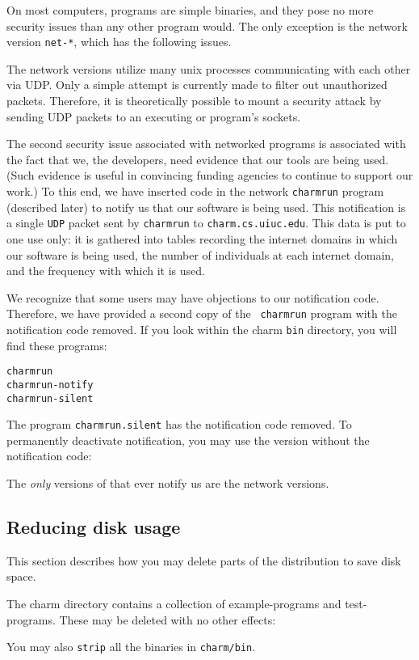 On most computers, \charmpp{} programs are simple binaries, and they pose
no more security issues than any other program would.  The only exception
is the network version {\tt net-*}, which has the following issues. 

The network versions utilize many unix processes communicating with
each other via UDP.  Only a simple attempt is currently made to filter out
unauthorized packets.  Therefore, it is theoretically possible to
mount a security attack by sending UDP packets to an executing
\converse{} or \charmpp{} program's sockets.

The second security issue associated with networked programs is
associated with the fact that we, the \charmpp{} developers, need evidence
that our tools are being used.  (Such evidence is useful in convincing
funding agencies to continue to support our work.)  To this end, we
have inserted code in the network {\tt charmrun} program (described
later) to notify us that our software is being used.
This notification is a single {\tt UDP} packet sent by {\tt charmrun}
to {\tt charm.cs.uiuc.edu}.  This data is put
to one use only: it is gathered into tables recording the internet
domains in which our software is being used, the number of individuals
at each internet domain, and the frequency with which it is used.

We recognize that some users may have objections to our notification
code.  Therefore, we have provided a second copy of the {\tt
charmrun} program with the notification code removed.  If you look
within the charm {\tt bin} directory, you will find these programs:

\begin{alltt}
    % cd charm/bin
    % ls charmrun*
    charmrun
    charmrun-notify
    charmrun-silent
\end{alltt}

The program {\tt charmrun.silent} has the notification code removed.  To
permanently deactivate notification, you may use the version without the
notification code:

\begin{alltt}
    % cd charm/bin
    % cp charmrun.silent charmrun
\end{alltt}

The {\em only} versions of \charmpp{} that ever notify us are 
the network versions.


\subsection{Reducing disk usage}

This section describes how you may delete parts of the distribution to
save disk space.  

The charm directory contains a collection of example-programs and
test-programs.  These may be deleted with no other effects:

\begin{alltt}
    % rm -r charm/pgms
\end{alltt}

You may also {\tt strip} all the binaries in {\tt charm/bin}.





